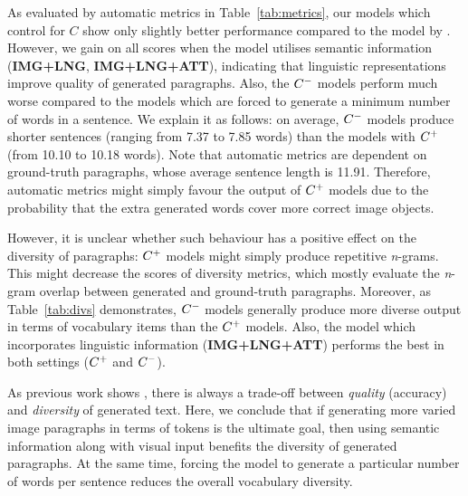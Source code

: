 \documentclass[11pt,a4paper]{article}
\begin{document}
As evaluated by automatic metrics in Table~\ref{tab:metrics}, our models which control for $C$ show only slightly better performance compared to the model by .
However, we gain on all scores when the model utilises semantic information (\textbf{IMG+LNG}, \textbf{IMG+LNG+ATT}), indicating that linguistic representations improve quality of generated paragraphs.
Also, the $C\sp{-}$ models perform much worse compared to the models which are forced to generate a minimum number of words in a sentence.
We explain it as follows: on average, $C\sp{-}$ models produce shorter sentences (ranging from 7.37 to 7.85 words) than the models with $C\sp{+}$ (from 10.10 to 10.18 words).
Note that automatic metrics are dependent on ground-truth paragraphs, whose average sentence length is 11.91.
Therefore, automatic metrics might simply favour the output of $C\sp{+}$ models due to the probability that the extra generated words cover more correct image objects.

However, it is unclear whether such behaviour has a positive effect on the diversity of paragraphs: $C\sp{+}$ models might simply produce repetitive \textit{n}-grams.
This might decrease the scores of diversity metrics, which mostly evaluate the \textit{n}-gram overlap between generated and ground-truth paragraphs.
Moreover, as Table~\ref{tab:divs} demonstrates, $C\sp{-}$ models generally produce more diverse output in terms of vocabulary items than the $C\sp{+}$ models.
Also, the model which incorporates linguistic information (\textbf{IMG+LNG+ATT}) performs the best in both settings ($C\sp{+}$ and $C\sp{-}$).

As previous work shows \cite{Caccia2018,Holtzman2019}, there is always a trade-off between \textit{quality} (accuracy) and \textit{diversity} of generated text.
Here, we conclude that if generating more varied image paragraphs in terms of tokens is the ultimate goal, then using semantic information along with visual input benefits the diversity of generated paragraphs.
At the same time, forcing the model to generate a particular number of words per sentence reduces the overall vocabulary diversity.


\end{document}
